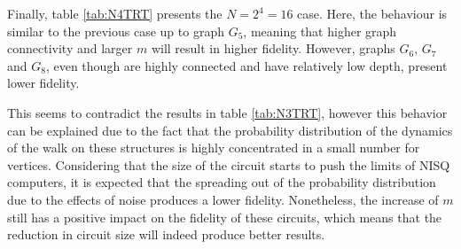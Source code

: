 \documentclass[../../dissertation.tex]{subfiles}
\begin{document}
Finally,  table \ref{tab:N4TRT} presents the $N = 2^4 = 16$ case. Here, the
behaviour is similar to the previous case up to graph $G_5$, meaning that
higher graph connectivity and larger $m$ will result in higher fidelity.
However, graphs $G_6$, $G_7$ and $G_8$, even though are highly connected and
have relatively low depth, present lower fidelity. 
\begin{table}[!h]
\centering
{}
\caption{Fidelity of quantum state with N=16, backend \textit{Toronto}, and t=1.}
\label{tab:N4TRT}
\end{table}
This seems to contradict the results in table \ref{tab:N3TRT}, however this
behavior can be explained due to the fact that the probability distribution of
the dynamics of the walk on these structures is highly concentrated in a small
number for vertices. Considering that the size of the circuit starts to push
the limits of NISQ computers, it is expected that the spreading out of the
probability distribution due to the effects of noise produces a lower
fidelity. Nonetheless, the increase of $m$ still has a positive impact on the
fidelity of these circuits, which means that the reduction in circuit size will
indeed produce better results.
\end{document}
